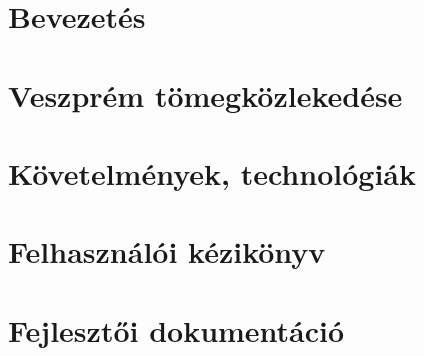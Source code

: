 \documentclass[a4paper,oneside,10pt]{report}
\begin{document}



\pagestyle{plain} %







\chapter{Bevezetés}
\label{bev}


\chapter{Veszprém tömegközlekedése}
\label{tom}


\chapter{Követelmények, technológiák}
\label{kov}


\chapter{Felhasználói kézikönyv}
\label{felhaszn}


\chapter{Fejlesztői dokumentáció}
\label{fejl}

\end{document}

